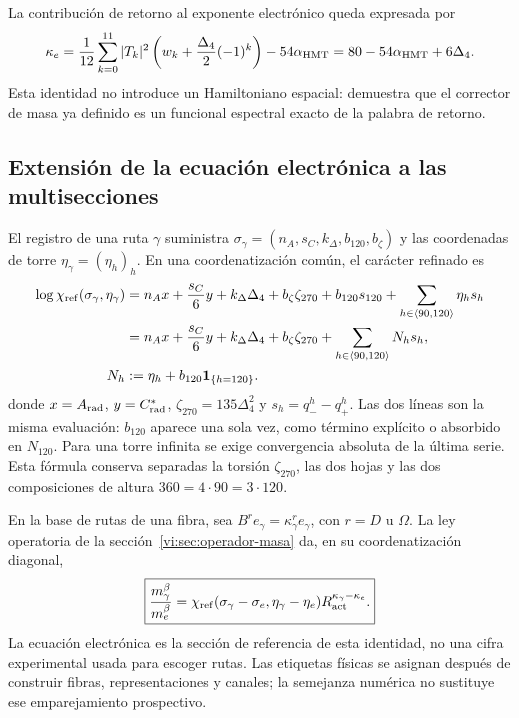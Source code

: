 La contribución de retorno al exponente electrónico queda expresada por
\begin{equation}
 \kappa_e=
 \frac1{12}\sum_{k=0}^{11}|T_k|^2
 \left(w_k+\frac{\Delta_4}{2}(-1)^k\right)-54\alpha_{\rm HMT}
 =80-54\alpha_{\rm HMT}+6\Delta_4.
 \label{vi:eq:kappa-espectral-electron}
\end{equation}
Esta identidad no introduce un Hamiltoniano espacial: demuestra que el
corrector de masa ya definido es un funcional espectral exacto de la palabra
de retorno.

\subsection{Extensión de la ecuación electrónica a las multisecciones}

El registro de una ruta $\gamma$ suministra
$\sigma_\gamma=(n_A,s_C,k_\Delta,b_{120},b_\zeta)$ y las coordenadas de
torre $\eta_\gamma=(\eta_h)_h$. En una coordenatización común, el carácter refinado es
\begin{equation}
 \begin{aligned}
 \log\chi_{\rm ref}(\sigma_\gamma,\eta_\gamma)
 &=n_Ax+\frac{s_C}{6}y+k_\Delta\Delta_4+b_\zeta\zeta_{270}
   +b_{120}s_{120}+\sum_{h\in\langle90,120\rangle}\eta_hs_h\\
 &=n_Ax+\frac{s_C}{6}y+k_\Delta\Delta_4+b_\zeta\zeta_{270}
   +\sum_{h\in\langle90,120\rangle}N_hs_h,\\
 N_h&:=\eta_h+b_{120}\mathbf1_{\{h=120\}}.
 \end{aligned}
 \label{vi:eq:caracter-refinado-explicito}
\end{equation}
donde $x=A_{\rm rad}$, $y=C^*_{\rm rad}$,
$\zeta_{270}=135\Delta_4^2$ y $s_h=q_-^h-q_+^h$. Las dos líneas son la
misma evaluación: $b_{120}$ aparece una sola vez, como término explícito o
absorbido en $N_{120}$. Para una torre infinita se exige convergencia absoluta
de la última serie. Esta fórmula conserva separadas la torsión $\zeta_{270}$,
las dos hojas y las dos composiciones de altura $360=4\cdot90=3\cdot120$.

En la base de rutas de una fibra, sea
$B^r e_\gamma=\kappa_\gamma^r e_\gamma$, con $r=D$ u $\Omega$. La ley
operatoria de la sección~\ref{vi:sec:operador-masa} da, en su coordenatización diagonal,
\begin{equation}
 \boxed{
 \frac{m_\gamma^\beta}{m_e^\beta}=
 \chi_{\rm ref}(\sigma_\gamma-\sigma_e,
                 \eta_\gamma-\eta_e)
 R_{\rm act}^{\kappa_\gamma-\kappa_e}.}
 \label{vi:eq:ley-masas-trayectoria}
\end{equation}
La ecuación electrónica es la sección de referencia de esta identidad, no
una cifra experimental usada para escoger rutas. Las etiquetas físicas se
asignan después de construir fibras, representaciones y canales; la semejanza
numérica no sustituye ese emparejamiento prospectivo.

